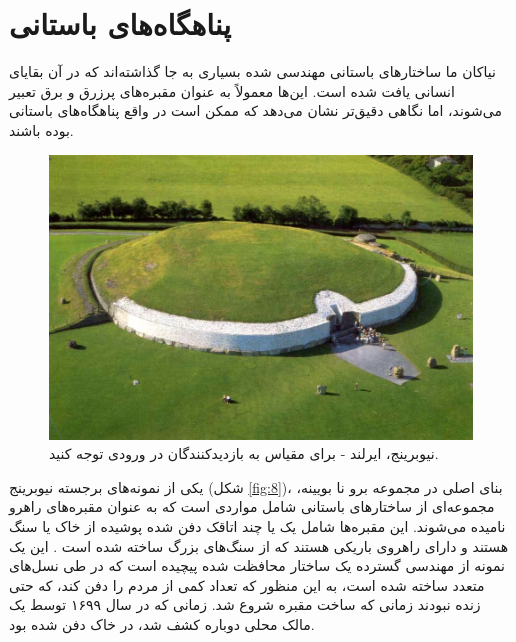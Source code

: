 \documentclass[10pt,twocolumn,letterpaper]{article}
\begin{document}
\section{پناهگاه‌های باستانی}

نیاکان ما ساختارهای باستانی مهندسی شده بسیاری به جا گذاشته‌اند که در آن بقایای انسانی یافت شده است. این‌ها معمولاً به عنوان مقبره‌های پرزرق و برق تعبیر می‌شوند، اما نگاهی دقیق‌تر نشان می‌دهد که ممکن است در واقع پناهگاه‌های باستانی بوده باشند.

\begin{figure}[b]
\begin{center}
   \includegraphics[width=1\linewidth]{ww19.jpg}
\end{center}
   \caption{نیوبرینج، ایرلند - برای مقیاس به بازدیدکنندگان در ورودی توجه کنید.}
\label{fig:8}
\label{fig:onecol}
\end{figure}

یکی از نمونه‌های برجسته نیوبرینج (شکل \ref{fig:8})، بنای اصلی در مجموعه برو نا بویینه، مجموعه‌ای از ساختارهای باستانی شامل مواردی است که به عنوان مقبره‌های راهرو نامیده می‌شوند. این مقبره‌ها شامل یک یا چند اتاقک دفن شده پوشیده از خاک یا سنگ هستند و دارای راهروی باریکی هستند که از سنگ‌های بزرگ ساخته شده است \cite{70}. این یک نمونه از مهندسی گسترده یک ساختار محافظت شده پیچیده است که در طی نسل‌های متعدد ساخته شده است، به این منظور که تعداد کمی از مردم را دفن کند، که حتی زنده نبودند زمانی که ساخت مقبره شروع شد. زمانی که در سال ۱۶۹۹ توسط یک مالک محلی دوباره کشف شد، در خاک دفن شده بود.
\end{document}

